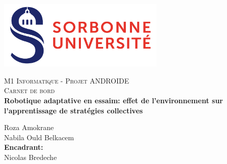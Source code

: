 \documentclass[11pt]{article}
\begin{document}
  \center \includegraphics[width=8cm]{logo.png}

\begin{center}
\textsc{\Large M1 Informatique - Projet ANDROIDE}\\[0.5cm]
\textsc{\Large  Carnet de bord }\\[0.5cm]
\textbf{Robotique adaptative en essaim: effet de l'environnement sur l'apprentissage de stratégies collectives} \\[3cm]
\end{center}


\begin{center}
Roza Amokrane\\[0.3cm]
Nabila Ould Belkacem\\[0.8cm]
\textbf{Encadrant:}\\
Nicolas Bredeche \\[0.4cm]
\end{center}


\newpage
\tableofcontents
\newpage
\end{document}

